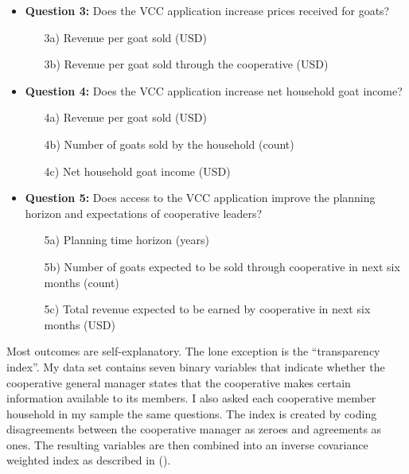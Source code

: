 \documentclass[11pt]{article}
\begin{document}
\begin{itemize}
    \item \textbf{Question 3:} Does the VCC application increase prices received for goats?
        \begin{enumerate}
            \item[3a)] Revenue per goat sold (USD)
            \item[3b)] Revenue per goat sold through the cooperative (USD)
        \end{enumerate}
    
    \item \textbf{Question 4:} Does the VCC application increase net household goat income?
        \begin{enumerate}
            \item[4a)] Revenue per goat sold (USD)
            \item[4b)] Number of goats sold by the household (count)
            \item[4c)] Net household goat income (USD) 
        \end{enumerate}
    \item \textbf{Question 5:} Does access to the VCC application improve the planning horizon and expectations of cooperative leaders?
    \begin{enumerate}
        \item[5a)] Planning time horizon (years)
        \item[5b)] Number of goats expected to be sold through cooperative in next six months (count)
        \item[5c)] Total revenue expected to be earned by cooperative in next six months (USD)
    \end{enumerate}
\end{itemize}
\doublespacing

Most outcomes are self-explanatory. The lone exception is the ``transparency index''. My data set contains seven binary variables that indicate whether the cooperative general manager states that the cooperative makes certain information available to its members. I also asked each cooperative member household in my sample the same questions. The index is created by coding disagreements between the cooperative manager as zeroes and agreements as ones. The resulting variables are then combined into an inverse covariance weighted index as described in \citeauthor{anderson08} (\citeyear{anderson08}). 
\end{document}
